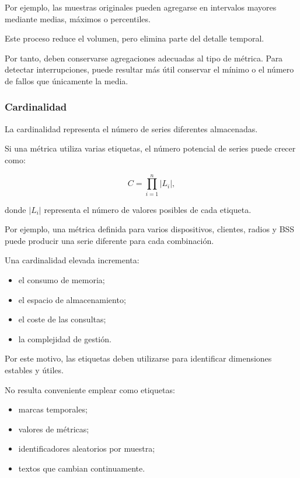 Por ejemplo, las muestras originales pueden agregarse en intervalos
mayores mediante medias, máximos o percentiles.

Este proceso reduce el volumen, pero elimina parte del detalle temporal.

Por tanto, deben conservarse agregaciones adecuadas al tipo de métrica.
Para detectar interrupciones, puede resultar más útil conservar el mínimo
o el número de fallos que únicamente la media.


\subsubsection*{Cardinalidad}

La cardinalidad representa el número de series diferentes almacenadas.

Si una métrica utiliza varias etiquetas, el número potencial de series
puede crecer como:

\[
    C
    =
    \prod_{i=1}^{n}
    |L_i|,
\]

donde \(|L_i|\) representa el número de valores posibles de cada
etiqueta.

Por ejemplo, una métrica definida para varios dispositivos, clientes,
radios y BSS puede producir una serie diferente para cada combinación.

Una cardinalidad elevada incrementa:

\begin{itemize}
    \item el consumo de memoria;

    \item el espacio de almacenamiento;

    \item el coste de las consultas;

    \item la complejidad de gestión.
\end{itemize}

Por este motivo, las etiquetas deben utilizarse para identificar
dimensiones estables y útiles.

No resulta conveniente emplear como etiquetas:

\begin{itemize}
    \item marcas temporales;

    \item valores de métricas;

    \item identificadores aleatorios por muestra;

    \item textos que cambian continuamente.
\end{itemize}



